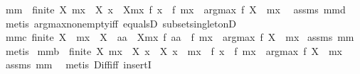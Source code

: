 \begin{isabellebody}
\ mm{}{}{\isacharcolon}\ \ {\isachardoublequoteopen}finite\ X{\isachardoublequoteclose}\ {\isachardoublequoteopen}mx\ {\isasymin}\ X{\isachardoublequoteclose}\ {\isachardoublequoteopen}{\isasymforall}x\ {\isasymin}\ X{\isacharminus}{\isacharbraceleft}mx{\isacharbraceright}{\isachardot}\ f\ x\ {\isacharless}\ f\ mx{\isachardoublequoteclose}\ \ {\isachardoublequoteopen}argmax\ f\ X\ {\isacharequal}\ {\isacharbraceleft}mx{\isacharbraceright}{\isachardoublequoteclose}\ \isanewline
%
\isadelimproof
%
\endisadelimproof
%
\isatagproof
{}\isamarkupfalse%
\ assms\ mm{}{}d\ \isamarkupfalse%
\ {\isacharparenleft}metis\ argmax{\isacharunderscore}non{\isacharunderscore}empty{\isacharunderscore}iff\ equals{}D\ subset{\isacharunderscore}singletonD{\isacharparenright}%
\endisatagproof
{\isafoldproof}%
%
\isadelimproof
\isanewline
%
\endisadelimproof
\isanewline
{}\isamarkupfalse%
\ mm{}{}c{\isacharcolon}\ {\isachardoublequoteopen}{\isacharparenleft}finite\ X\ {\isacharampersand}\ mx\ {\isasymin}\ X\ {\isacharampersand}\ {\isacharparenleft}{\isasymforall}aa\ {\isasymin}\ X{\isacharminus}{\isacharbraceleft}mx{\isacharbraceright}{\isachardot}\ f\ aa\ {\isacharless}\ f\ mx{\isacharparenright}{\isacharparenright}\ {\isasymlongrightarrow}\ argmax\ f\ X\ {\isacharequal}\ {\isacharbraceleft}mx{\isacharbraceright}{\isachardoublequoteclose}\isanewline
%
\isadelimproof
%
\endisadelimproof
%
\isatagproof
{}\isamarkupfalse%
\ assms\ mm{}{}\ \isamarkupfalse%
\ metis%
\endisatagproof
{\isafoldproof}%
%
\isadelimproof
\isanewline
%
\endisadelimproof
\isanewline
{}\isamarkupfalse%
\ mm{}{}b{\isacharcolon}\ \ {\isachardoublequoteopen}finite\ X{\isachardoublequoteclose}\ {\isachardoublequoteopen}mx\ {\isasymin}\ X{\isachardoublequoteclose}\ {\isachardoublequoteopen}{\isasymforall}x\ {\isasymin}\ X{\isachardot}\ x\ {\isasymnoteq}\ mx\ {\isasymlongrightarrow}\ f\ x\ {\isacharless}\ f\ mx{\isachardoublequoteclose}\ \ {\isachardoublequoteopen}argmax\ f\ X\ {\isacharequal}\ {\isacharbraceleft}mx{\isacharbraceright}{\isachardoublequoteclose}\isanewline
%
\isadelimproof
%
\endisadelimproof
%
\isatagproof
{}\isamarkupfalse%
\ assms\ mm{}{}\ \isamarkupfalse%
\ {\isacharparenleft}metis\ Diff{\isacharunderscore}iff\ insertI{}{\isacharparenright}%

\end{isabellebody}
